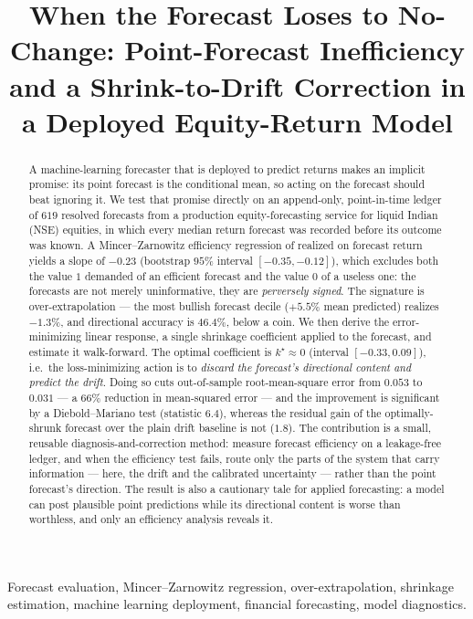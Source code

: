 \documentclass[10pt,twocolumn,twoside]{eec_style}
\title{When the Forecast Loses to No-Change: Point-Forecast Inefficiency and a
Shrink-to-Drift Correction in a Deployed Equity-Return Model}
\begin{document}
\maketitle

\begin{abstract}
A machine-learning forecaster that is deployed to predict returns makes an implicit
promise: its point forecast is the conditional mean, so acting on the forecast should
beat ignoring it. We test that promise directly on an append-only, point-in-time
ledger of $619$ resolved forecasts from a production equity-forecasting service for
liquid Indian (NSE) equities, in which every median return forecast was recorded
before its outcome was known. A Mincer--Zarnowitz efficiency regression of realized
on forecast return yields a slope of $-0.23$ (bootstrap $95\%$ interval
$[-0.35,-0.12]$), which excludes both the value $1$ demanded of an efficient forecast
and the value $0$ of a useless one: the forecasts are not merely uninformative, they
are \emph{perversely signed}. The signature is over-extrapolation --- the most bullish
forecast decile ($+5.5\%$ mean predicted) realizes $-1.3\%$, and directional accuracy
is $46.4\%$, below a coin. We then derive the error-minimizing linear response, a
single shrinkage coefficient applied to the forecast, and estimate it walk-forward.
The optimal coefficient is $k^\star\approx 0$ (interval $[-0.33,0.09]$), i.e.\ the
loss-minimizing action is to \emph{discard the forecast's directional content and
predict the drift}. Doing so cuts out-of-sample root-mean-square error from $0.053$ to
$0.031$ --- a $66\%$ reduction in mean-squared error --- and the improvement is
significant by a Diebold--Mariano test (statistic $6.4$), whereas the residual gain of
the optimally-shrunk forecast over the plain drift baseline is not ($1.8$). The
contribution is a small, reusable diagnosis-and-correction method: measure forecast efficiency
on a leakage-free ledger, and when the efficiency test fails, route only the parts of
the system that carry information --- here, the drift and the calibrated uncertainty ---
rather than the point forecast's direction. The result is also a cautionary tale for
applied forecasting: a model can post plausible point predictions while its directional
content is worse than worthless, and only an efficiency analysis reveals it.
\end{abstract}

\begin{keywords}
Forecast evaluation, Mincer--Zarnowitz regression, over-extrapolation, shrinkage
estimation, machine learning deployment, financial forecasting, model diagnostics.
\end{keywords}
\end{document}
